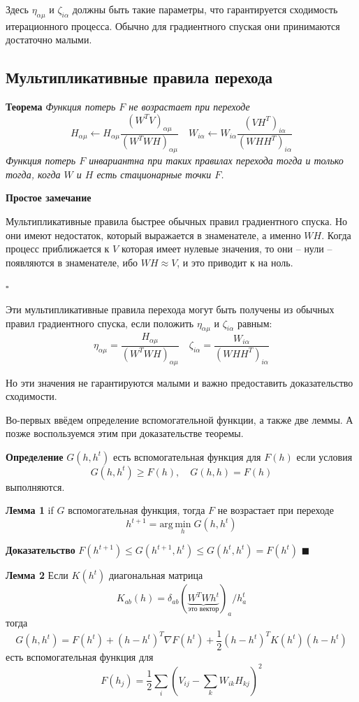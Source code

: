 \documentclass[oneside, final, 12pt]{extarticle}
\begin{document}
Здесь $\eta_{\alpha\mu}$ и $\zeta_{i\alpha}$ должны быть
такие параметры, что гарантируется сходимость итерационного
процесса.
Обычно для градиентного спуская они принимаются достаточно малыми.

\subsection{Мультипликативные правила перехода}

\textbf{Теорема} \textit{ Функция потерь $F$ не возрастает
при переходе
\[
  H_{\alpha\mu} \leftarrow H_{\alpha\mu}
  \frac{(W^TV)_{\alpha\mu}}{(W^TWH)_{\alpha\mu}} \quad
  W_{i\alpha} \leftarrow W_{i\alpha}
  \frac{(VH^T)_{i\alpha}}{(WHH^T)_{i\alpha}}
\]
Функция потерь $F$ инвариантна при таких правилах перехода тогда
и только тогда, когда $W$ и $H$ есть стационарные точки $F$.
}

\textbf{Простое замечание}

Мультипликативные правила быстрее обычных правил градиентного
спуска. Но они имеют недостаток, который выражается в знаменателе,
а именно $WH$. Когда процесс приближается к $V$ которая имеет нулевые
значения, то они -- нули -- появляются в знаменателе, ибо
$WH \approx V$, и это приводит
к { на ноль}.

$\square$

Эти мультипликативные правила перехода могут быть получены из
обычных правил градиентного спуска, если положить
$\eta_{\alpha\mu}$ и $\zeta_{i\alpha}$ равным:
\[
  \eta_{\alpha\mu} =
  \frac {H_{\alpha\mu}}
        {(W^TWH)_{\alpha\mu}} \quad
  \zeta_{i\alpha} =
  \frac {W_{i\alpha}}
        {(WHH^T)_{i\alpha}}
\]

Но эти значения не гарантируются малыми и важно предоставить
доказательство сходимости.

Во-первых ввёдем определение вспомогательной функции, а также две леммы.
А позже воспользуемся этим при доказательстве теоремы.

\textbf{Определение} $G(h,h^t)$ есть вспомогательная функция для $F(h)$
если условия
\[
  G(h,h^t) \geqslant F(h), \quad G(h,h) = F(h)
\]
выполняются.

\textbf{Лемма 1} if $G$ вспомогательная функция,
тогда $F$ не возрастает при переходе
\[
  h^{t+1} = \text{arg} \, \underset{h}{\text{min}} \; G(h,h^t)
\]

\textbf{Доказательство}
$F(h^{t+1}) \leqslant G(h^{t+1},h^t) \leqslant G(h^t,h^t) = F(h^t)$
$\blacksquare$

\textbf{Лемма 2} Если $K(h^t)$ диагональная матрица
\[
  K_{ab}(h) =
  \delta_{ab}
  (\underbrace{W^T W h^t}
    _{\text{это вектор}}
  )_a / h_a^t
\]
тогда
\begin{equation}\label{E:auxghht}
  G(h,h^t) = F(h^t) + (h - h^t)^T \nabla F(h^t)
    + \frac{1}{2} (h - h^t)^T K(h^t) (h - h^t)
\end{equation}
есть вспомогательная функция для
\[
  F(h_j) = \frac{1}{2} \sum_{i}
  \left(
    V_{ij} - \sum_{k}W_{ik}H_{kj}
  \right)^2
\]
\end{document}
